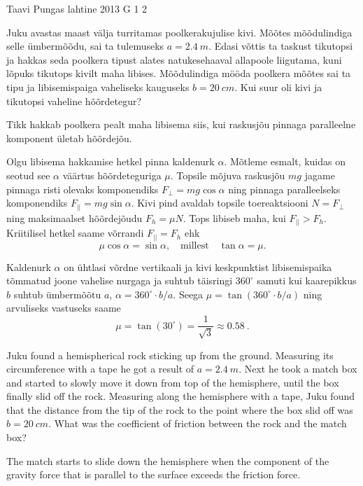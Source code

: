 {Taavi Pungas} %
{lahtine} %
{2013} %
{G 1} %
{2} %
{
\ifStatement
Juku avastas maast välja turritamas poolkerakujulise kivi. Mõõtes mõõdulindiga
selle ümbermõõdu, sai ta tulemuseks $a=\SI{2,4}{m}$. Edasi võttis ta taskust tikutopsi ja
hakkas seda poolkera tipust alates natukesehaaval allapoole liigutama, kuni
lõpuks tikutops kivilt maha libises. Mõõdulindiga mööda poolkera mõõtes sai ta
tipu ja libisemispaiga vaheliseks kauguseks $b=\SI{20}{cm}$. Kui suur oli kivi
ja tikutopsi vaheline hõõrdetegur?
\fi


\ifHint
Tikk hakkab poolkera pealt maha libisema siis, kui raskusjõu pinnaga paralleelne komponent ületab hõõrdejõu.
\fi


\ifSolution
Olgu libisema hakkamise hetkel pinna kaldenurk $\alpha$. Mõtleme esmalt, kuidas on seotud see $\alpha$ väärtus hõõrdeteguriga $\mu$. Topsile mõjuva raskusjõu $mg$ jagame pinnaga risti olevaks komponendiks $F_{\bot}=mg\cos\alpha$ ning pinnaga paralleelseks komponendiks $F_{||}=mg\sin\alpha$. Kivi pind avaldab topsile toereaktsiooni $N=F_\bot$ ning maksimaalset hõõrdejõudu $F_h=\mu N$. Tops libiseb maha, kui $F_{||}>F_h$. Kriitilisel hetkel saame võrrandi $F_{||}=F_h$ ehk
\[ \mu \cos \alpha = \sin\alpha, \quad \text{millest} \quad \tan\alpha = \mu.\]

Kaldenurk $\alpha$ on ühtlasi võrdne vertikaali ja kivi keskpunktist libisemispaika tõmmatud joone vahelise nurgaga ja suhtub täisringi $360^\circ$ samuti kui kaarepikkus $b$ suhtub ümbermõõtu $a$, $\alpha = 360^\circ \!\cdot\! b/a$. Seega $\mu = \tan (360^\circ \! \cdot\! b/a)$ ning arvuliseks vastuseks saame 
\[\mu = \tan (30^\circ) = \frac{1}{\sqrt{3}} \approx \SI{0,58}{}.\]
\fi


\ifEngStatement
Juku found a hemispherical rock sticking up from the ground. Measuring its circumference with a tape he got a result of $a=\SI{2,4}{m}$. Next he took a match box and started to slowly move it down from top of the hemisphere, until the box finally slid off the rock. Measuring along the hemisphere with a tape, Juku found that the distance from the tip of the rock to the point where the box slid off was $b=\SI{20}{cm}$. What was the coefficient of friction between the rock and the match box?
\fi


\ifEngHint
The match starts to slide down the hemisphere when the component of the gravity force that is parallel to the surface exceeds the friction force.
\fi


}
